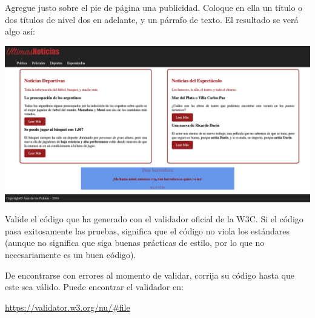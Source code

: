 \begin{exercise}
Agregue justo sobre el pie de página una publicidad. Coloque en ella
un título o dos títulos de nivel dos en adelante, y un párrafo de
texto. El resultado se verá algo así:

\includegraphics[scale=0.3]{anexos/html/imagenes/diario_6.png}
\end{exercise}

\begin{exercise}
  Valide el código que ha generado con el validador oficial de la W3C.
  Si el código pasa exitosamente las pruebas, significa que el código
  no viola los estándares (aunque no significa que siga buenas prácticas
  de estilo, por lo que no necesariamente es un buen código).

  De encontrarse con errores al momento de validar, corrija su código
  hasta que este sea válido. Puede encontrar el validador en:

  \href{https://validator.w3.org/nu/\#file}{https://validator.w3.org/nu/\#file}
\end{exercise}

